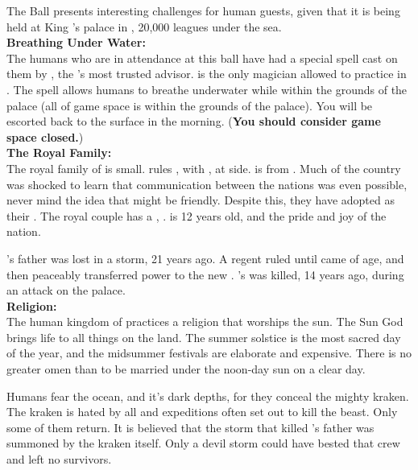 \documentclass[blue]{NeptuneBall}
\begin{document}
\name{\bHuman{}}

The \cExExKing{} Ball presents interesting challenges for human guests, given that it is being held at King \cKing{\MYname{}}'s palace in \pAtlantis{}, 20,000 leagues under the sea.\\

{\bf Breathing Under Water:}\\
The humans who are in attendance at this ball have had a special spell cast on them by \cManta{}, the \cKing{\King}'s most trusted advisor. \cManta{} is the only magician allowed to practice in \pAtlantis{}. The spell allows humans to breathe underwater while within the grounds of the palace (all of game space is within  the grounds of the palace). You will be escorted back to the surface in the morning. ({\bf You should consider game space closed.})\\

{\bf The Royal Family:}\\
The royal family of \pAmerica{} is small. \cEric{\King} \cEric{} rules \pAmerica{}, with \cEric{\their} \cAriel{\spouse}, \cAriel{\King} \cAriel{} at \cEric{\their} side. \cAriel{} is from \pAtlantis{}. Much of the country was shocked to learn that communication between the nations was even possible, never mind the idea that \pAtlantis{} might be friendly. Despite this, they have adopted \cAriel{} as their \cAriel{\King}. The royal couple has a \cWillow{\offspring}, \cWillow{\prince} \cWillow{}. \cWillow{\They} is 12 years old, and the pride and joy of the nation.

\cEric{}'s father was lost in a storm, 21 years ago. A regent ruled until \cEric{} came of age, and then peaceably transferred power to the new \cEric{\King}. \cEric{}'s \cSlave{\sibling} was killed, 14 years ago, during an attack on the palace.\\

{\bf Religion:}\\
The human kingdom of \pAmerica{} practices a religion that worships the sun. The Sun God brings life to all things on the land. The summer solstice is the most sacred day of the year, and the midsummer festivals are elaborate and expensive. There is no greater omen than to be married under the noon-day sun on a clear day.

Humans fear the ocean, and it's dark depths, for they conceal the mighty kraken. The kraken is hated by all and expeditions often set out to kill the beast. Only some of them return. It is believed that the storm that killed \cEric{}'s father was summoned by the kraken itself. Only a devil storm could have bested that crew and left no survivors.\\
\end{document}
